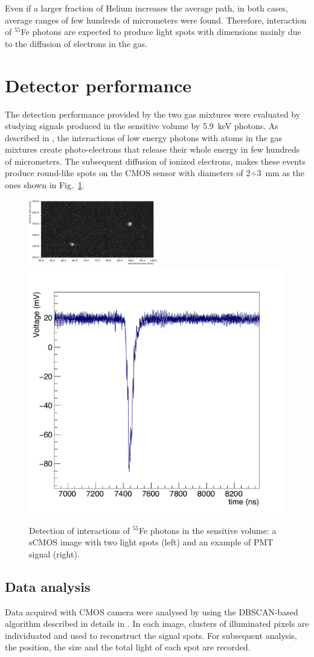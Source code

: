 \documentclass[a4paper,11pt]{article}
\begin{document}
Even if a larger fraction of Helium increases the average path, in both cases, average ranges of few hundreds of micrometers were found. Therefore, interaction of $^{55}$Fe photons are expected to produce light spots with dimensions mainly due to the diffusion of electrons in the gas.

\section{Detector performance}

The detection performance provided by the two gas mixtures were evaluated by studying signals produced in the sensitive volume by 5.9~keV photons.
As described in \cite{bib:fe55}, the interactions of low energy photons with atoms in the gas mixtures create photo-electrons that release their whole energy in few hundreds of micrometers.
The subsequent diffusion of ionized electrons, makes these events produce round-like spots on the CMOS sensor with diameters of 2$\div$3~mm as the ones shown in Fig.~\ref{fig:spot}.

\begin{figure}[ht]
\centering
\includegraphics[width=0.5\textwidth]{Figures/I31Run2163.pdf}
\includegraphics[width=0.288\linewidth]{Figures/WaveformIron2.pdf}
\caption{Detection of interactions of $^{55}$Fe photons in the sensitive volume: a sCMOS image with two light spots (left) and an example of PMT signal (right).} 
\label{fig:spot}
\end{figure}

\subsection{Data analysis}

Data acquired with CMOS camera were analysed by using the DBSCAN-based algorithm described in details in \cite{bib:algo}. In each image, clusters of illuminated pixels are individuated and used to reconstruct the signal spots.
For subsequent analysis, the position, the size and the total light of each spot are recorded.
\end{document}
